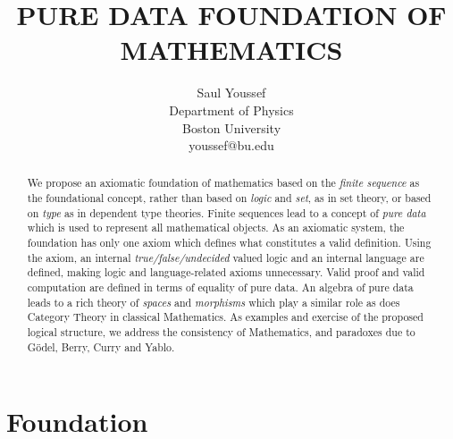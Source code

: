 \documentclass[11pt]{article}
\begin{document}
\title{\bf {PURE DATA FOUNDATION OF MATHEMATICS}}
\author{%
  Saul Youssef%
  \hfil \\
  Department of Physics \\
  Boston University \\
  youssef@bu.edu\\
}
\maketitle
\begin{abstract}
We propose an axiomatic foundation of mathematics based on the {\it finite sequence} as the foundational concept, rather than based 
on {\it logic} and {\it set}, as in set theory, or based on {\it type} as in dependent type theories.  Finite sequences lead to a concept of {\it pure data} which is
used to represent all mathematical objects.  As an axiomatic system, the foundation has only one axiom which
defines what constitutes a valid definition.  Using the axiom, an internal {\it true/false/undecided} valued logic and an internal language are defined, making 
logic and language-related axioms unnecessary.  Valid proof and valid computation are defined in terms of equality of pure data.  An algebra of pure data
leads to a rich theory of {\it spaces} and {\it morphisms} which play a similar role as does Category Theory in classical Mathematics.  As examples and
exercise of the proposed logical structure, we address the consistency of Mathematics, and paradoxes due to G\"odel, Berry, Curry and Yablo.
\end{abstract}

\section{Foundation}
\end{document}
